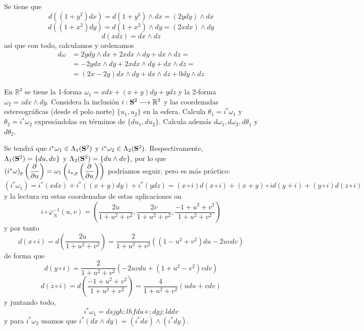\begin{sol}
        Se tiene que
        $$d((1+y^2)dx)=d(1+y^2)\wedge dx = (2ydy)\wedge dx$$
        $$d((1+x^2)dy) =d(1+x^2)\wedge dy = (2xdx)\wedge dy$$
        $$d(xdz)=dx \wedge dz$$
        as\'i que con todo, calculamos y ordenamos
     \[\begin{split}
         d\omega & = 2ydy \wedge dx+2xdx\wedge dy + dx\wedge dz = \\ & = -2ydx\wedge dy + 2xdx\wedge dy + dx\wedge dz = \\ & = (2x-2y) dx\wedge dy + dx \wedge dz + 0 dy \wedge dz
     \end{split}\]
     
 \end{sol}
 \begin{ejer}
     [5.13] En $\mathbb R^3$ se tiene la 1-forma $\omega_1 = xdx + (x + y)dy + ydz$ y la 2-forma $\omega_2 = zdx \wedge dy$. Considera la inclusi\'on $i : \bold S^2 \longrightarrow \mathbb R^3$ y las coordenadas estereogr\'aficas (desde el polo
norte) $\{u_1, u_2\}$ en la esfera. Calcula $\theta_1 = i^*\omega_1$ y $\theta_2 = i^*\omega_2$ expres\'andolas en t\'erminos de $\{du_1, du_2\}$. Calcula adem\'as $d\omega_1, d\omega_2, d\theta_1$ y $d\theta_2$.
 \end{ejer}
 \begin{sol}
     Se tendr\'a que $i^*\omega_1 \in \Lambda_1(\bold S^2)$ y $i^*\omega_2 \in \Lambda_2(\bold S^2)$. Respectivamente, $\Lambda_1(\bold S^2)=\{du,dv\}$ y $\Lambda_2(\bold S^2)=\{du\wedge dv\}$, por lo que $(i^*\omega)_p \left(\dfrac{\partial^{} }{\partial u} \right) = \omega_1 \left(i_{*,p} \left( \dfrac{\partial^{} }{\partial u}\right)\right)$ podr\'iamos seguir, pero es m\'as pr\'actico:
     $$(i^* \omega_1) = i^*(x dx)+i^*((x+y)dy) + i^*(ydz) = (x\circ i) d(x\circ i) + (x+y) \circ i d(y+i) + (y \circ i) d(z\circ i)$$
     y la lectura en estas coordenadas de estas aplicaciones on
     $$i \circ \varphi_N^{-1}(u,v) = \left( \dfrac{2u}{1+u^2+v^2}, \dfrac{2v}{1+u^2+v^2}, \dfrac{-1+u^2+v^2}{1+u^2+v^2} \right)$$
     y por tanto
     $$d(x\circ i) = d \left( \dfrac{2u}{1+u^2+v^2}\right) = \dfrac{2}{1+u^2+v^2} \left((1-u^2+v^2)du-2uvdv\right)$$
     de forma que 
     $$d(y\circ i) = \dfrac{2}{1+u^2+v^2} \left(-2uvdu+(1+u^2-v^2)vdv\right)$$ 
    $$d(z\circ i) = d\left( \dfrac{-1+u^2+v^2}{1+u^2+v^2}\right) = \dfrac{4}{1+u^2+v^2} \left( udu+vdv \right)$$
    y juntando todo,
    $$i^*\omega_1 = dsjgh;lhf du + ;dgj;ld dv$$
    y para $i^*\omega _2$ usamos que $i^*(dx\wedge dy) = (i^*dx )\wedge (i^*dy)$.
 \end{sol}
